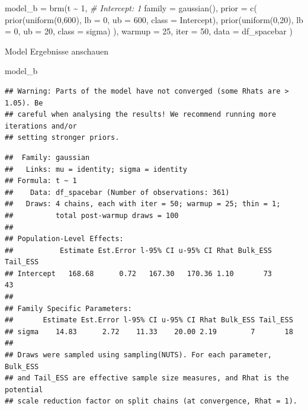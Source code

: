 \documentclass[
]{article}
\newenvironment{Shaded}{\begin{snugshade}}{\end{snugshade}}
\newcommand{\AttributeTok}[1]{\textcolor[rgb]{0.77,0.63,0.00}{#1}}
\newcommand{\CommentTok}[1]{\textcolor[rgb]{0.56,0.35,0.01}{\textit{#1}}}
\newcommand{\DecValTok}[1]{\textcolor[rgb]{0.00,0.00,0.81}{#1}}
\newcommand{\FunctionTok}[1]{\textcolor[rgb]{0.00,0.00,0.00}{#1}}
\newcommand{\NormalTok}[1]{#1}
\newcommand{\OtherTok}[1]{\textcolor[rgb]{0.56,0.35,0.01}{#1}}
\newcommand{\SpecialCharTok}[1]{\textcolor[rgb]{0.00,0.00,0.00}{#1}}
\begin{document}
\begin{Shaded}
\begin{Highlighting}[]
\NormalTok{model\_b }\OtherTok{=} \FunctionTok{brm}\NormalTok{(t }\SpecialCharTok{\textasciitilde{}} \DecValTok{1}\NormalTok{,    }\CommentTok{\# Intercept: 1}
              \AttributeTok{family =} \FunctionTok{gaussian}\NormalTok{(),}
              \AttributeTok{prior =}
                  \FunctionTok{c}\NormalTok{(}
                    \FunctionTok{prior}\NormalTok{(}\FunctionTok{uniform}\NormalTok{(}\DecValTok{0}\NormalTok{,}\DecValTok{600}\NormalTok{), }\AttributeTok{lb =} \DecValTok{0}\NormalTok{, }\AttributeTok{ub =} \DecValTok{600}\NormalTok{, }\AttributeTok{class =}\NormalTok{ Intercept),}
                    \FunctionTok{prior}\NormalTok{(}\FunctionTok{uniform}\NormalTok{(}\DecValTok{0}\NormalTok{,}\DecValTok{20}\NormalTok{), }\AttributeTok{lb =} \DecValTok{0}\NormalTok{, }\AttributeTok{ub =} \DecValTok{20}\NormalTok{, }\AttributeTok{class =}\NormalTok{ sigma)}
\NormalTok{                  ),}
              \AttributeTok{warmup =} \DecValTok{25}\NormalTok{,}
              \AttributeTok{iter =} \DecValTok{50}\NormalTok{,}
                \AttributeTok{data =}\NormalTok{ df\_spacebar}
\NormalTok{              )}
\end{Highlighting}
\end{Shaded}

Model Ergebnisse anschauen

\begin{Shaded}
\begin{Highlighting}[]
\NormalTok{model\_b}
\end{Highlighting}
\end{Shaded}

\begin{verbatim}
## Warning: Parts of the model have not converged (some Rhats are > 1.05). Be
## careful when analysing the results! We recommend running more iterations and/or
## setting stronger priors.
\end{verbatim}

\begin{verbatim}
##  Family: gaussian 
##   Links: mu = identity; sigma = identity 
## Formula: t ~ 1 
##    Data: df_spacebar (Number of observations: 361) 
##   Draws: 4 chains, each with iter = 50; warmup = 25; thin = 1;
##          total post-warmup draws = 100
## 
## Population-Level Effects: 
##           Estimate Est.Error l-95% CI u-95% CI Rhat Bulk_ESS Tail_ESS
## Intercept   168.68      0.72   167.30   170.36 1.10       73       43
## 
## Family Specific Parameters: 
##       Estimate Est.Error l-95% CI u-95% CI Rhat Bulk_ESS Tail_ESS
## sigma    14.83      2.72    11.33    20.00 2.19        7       18
## 
## Draws were sampled using sampling(NUTS). For each parameter, Bulk_ESS
## and Tail_ESS are effective sample size measures, and Rhat is the potential
## scale reduction factor on split chains (at convergence, Rhat = 1).
\end{verbatim}
\end{document}
